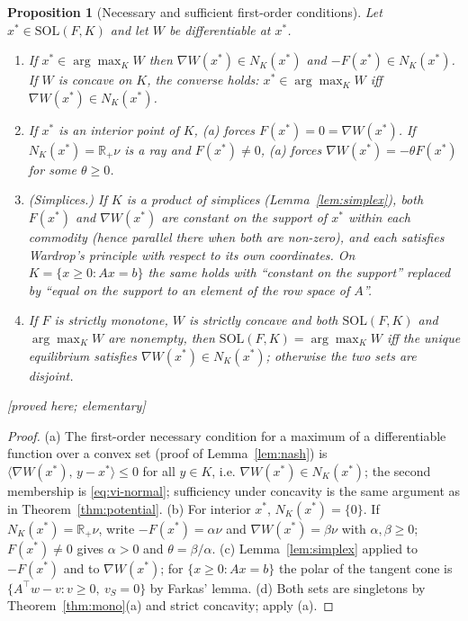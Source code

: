 \documentclass[11pt,a4paper]{article}
\theoremstyle{plain}
\newtheorem{proposition}[theorem]{Proposition}
\theoremstyle{definition}
\theoremstyle{remark}
\newcommand{\R}{\mathbb{R}}
\newcommand{\SOL}{\mathrm{SOL}}
\newcommand{\NC}{N}
\newcommand{\ip}[2]{\langle #1,\,#2\rangle}
\newcommand{\status}[1]{\textsf{\small [#1]}}
\begin{document}
\begin{proposition}[Necessary and sufficient first-order conditions]\label{prop:nec}
Let $x^*\in\SOL(F,K)$ and let $W$ be differentiable at $x^*$.
\begin{enumerate}[leftmargin=2em,label=(\alph*)]
\item If $x^*\in\arg\max_KW$ then $\nabla W(x^*)\in\NC_K(x^*)$ and $-F(x^*)\in\NC_K(x^*)$. If $W$ is concave on $K$, the converse holds: $x^*\in\arg\max_KW$ iff $\nabla W(x^*)\in\NC_K(x^*)$.
\item If $x^*$ is an interior point of $K$, (a) forces $F(x^*)=0=\nabla W(x^*)$. If $\NC_K(x^*)=\R_+\nu$ is a ray and $F(x^*)\ne 0$, (a) forces $\nabla W(x^*)=-\theta F(x^*)$ for some $\theta\ge 0$.
\item (Simplices.) If $K$ is a product of simplices (Lemma~\ref{lem:simplex}), both $F(x^*)$ and $\nabla W(x^*)$ are constant on the support of $x^*$ within each commodity (hence parallel there when both are non-zero), and each satisfies Wardrop's principle with respect to its own coordinates. On $K=\{x\ge0:Ax=b\}$ the same holds with ``constant on the support'' replaced by ``equal on the support to an element of the row space of $A$''.
\item If $F$ is strictly monotone, $W$ is strictly concave and both $\SOL(F,K)$ and $\arg\max_KW$ are nonempty, then $\SOL(F,K)=\arg\max_KW$ iff the unique equilibrium satisfies $\nabla W(x^*)\in\NC_K(x^*)$; otherwise the two sets are disjoint.
\end{enumerate}
\status{proved here; elementary}
\end{proposition}
\begin{proof}
(a) The first-order necessary condition for a maximum of a differentiable function over a convex set (proof of Lemma~\ref{lem:nash}) is $\ip{\nabla W(x^*)}{y-x^*}\le 0$ for all $y\in K$, i.e. $\nabla W(x^*)\in\NC_K(x^*)$; the second membership is \eqref{eq:vi-normal}; sufficiency under concavity is the same argument as in Theorem~\ref{thm:potential}. (b) For interior $x^*$, $\NC_K(x^*)=\{0\}$. If $\NC_K(x^*)=\R_+\nu$, write $-F(x^*)=\alpha\nu$ and $\nabla W(x^*)=\beta\nu$ with $\alpha,\beta\ge 0$; $F(x^*)\ne 0$ gives $\alpha>0$ and $\theta=\beta/\alpha$. (c) Lemma~\ref{lem:simplex} applied to $-F(x^*)$ and to $\nabla W(x^*)$; for $\{x\ge0:Ax=b\}$ the polar of the tangent cone is $\{A^{\!\top}w-v:v\ge0,\ v_S=0\}$ by Farkas' lemma. (d) Both sets are singletons by Theorem~\ref{thm:mono}(a) and strict concavity; apply (a).
\end{proof}
\end{document}
